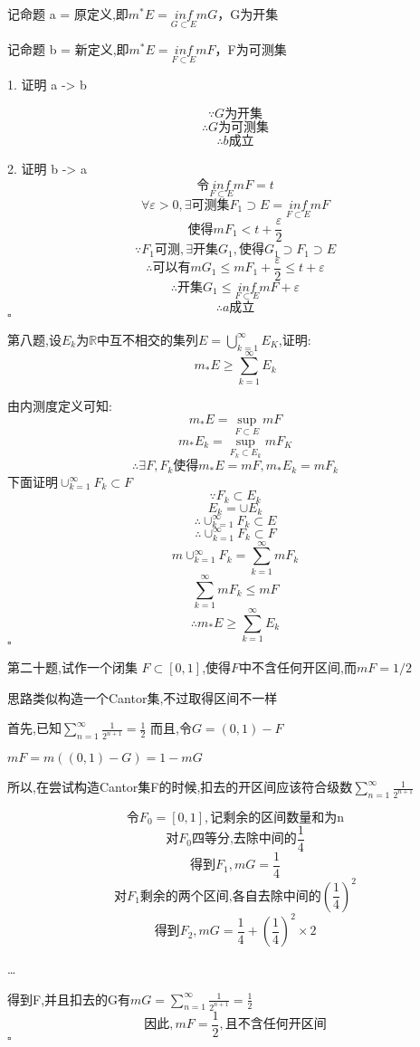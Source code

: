 \documentclass[a4paper]{article}
\begin{document}
        记命题 a = 原定义,即$m^{*}E=\underset{G\subset E}{inf}mG$，G为开集

        记命题 b = 新定义,即$m^{*}E=\underset{F\subset E}{inf}mF$，F为可测集

        1. 证明 a -> b

        \[\because G \text{为开集}\]
        \[\therefore G \text{为可测集}\]
        \[\therefore b\text{成立}\]

        2. 证明 b -> a
        \[令\underset{F\subset E}{inf}mF = t\]
        \[\forall \varepsilon >0,\exists \text{可测集}F_1 \supset E=\underset{F\subset E}{inf}mF\]
        \[\text{使得}mF_1<t+\frac{\varepsilon}{2}\]
        \[\because F_1 \text{可测},\exists \text{开集}G_1,\text{使得}G_1\supset F_1\supset E\]
        \[\therefore \text{可以有}mG_1 \le mF_1 + \frac{\varepsilon}{2} \le t + \varepsilon\]
        \[\therefore \text{开集}G_1 \le \underset{F\subset E}{inf}mF + \varepsilon\]
        \[\therefore a\text{成立}\]
    \hfill $\square$
    
    第八题,设${E_k}$为$\mathbb{R}$中互不相交的集列$E=\bigcup_{k=1}^{\infty}E_K$,证明:
    \[m_{*}E\geq \sum_{k=1}^{\infty}E_k\]

        由内测度定义可知:   
        \[m_{*}E=\sup_{F\subset E}mF\]
        \[m_{*}E_k=\sup_{F_k\subset E_k}mF_K\]
        \[\therefore \exists F,F_k \text{使得}m_{*}E=mF,m_{*}E_k=mF_k\]
        下面证明$\cup_{k=1}^{\infty}F_k\subset F$
        \[\because F_k \subset E_k\]
        \[E_k=\cup E_k\]
        \[\therefore \cup_{k=1}^{\infty}F_k\subset E\]
        \[\therefore \cup_{k=1}^{\infty}F_k\subset F\]
        \[m\cup_{k=1}^{\infty}F_k = \sum_{k=1}^{\infty}mF_k\]
        \[\sum_{k=1}^{\infty}mF_k \le mF\]
        \[\therefore m_{*}E\geq \sum_{k=1}^{\infty}E_k\]
    \hfill $\square$

    第二十题,试作一个闭集 $F\subset[0,1]$,使得$F$中不含任何开区间,而$mF=1/2$

        思路类似构造一个Cantor集,不过取得区间不一样

        首先,已知$\sum_{n=1}^{\infty} \frac{1}{2^{n+1}} = \frac{1}{2}$
        而且,令$G=(0,1)-F$

        $mF=m((0,1)-G)=1-mG$
        
        所以,在尝试构造Cantor集F的时候,扣去的开区间应该符合级数$\sum_{n=1}^{\infty} \frac{1}{2^{n+1}}$

        \[\text{令}F_0=[0,1],\text{记剩余的区间数量和为n}\]
        \[\text{对}F_0\text{四等分,去除中间的}\frac{1}{4}\]
        \[\text{得到}F_1,mG=\frac{1}{4}\]
        \[\text{对}F_1\text{剩余的两个区间,各自去除中间的}(\frac{1}{4})^2\]
        \[\text{得到}F_2,mG=\frac{1}{4} + (\frac{1}{4})^2\times2\]

        \ldots

        得到F,并且扣去的G有$mG=\sum_{n=1}^{\infty} \frac{1}{2^{n+1}} = \frac{1}{2}$
        \[\text{因此},mF=\frac{1}{2},\text{且不含任何开区间}\]
    \hfill $\square$
\end{document}
